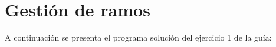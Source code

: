 \section{Gestión de ramos}

  A continuación se presenta el programa solución
  del ejercicio 1 de la guía:
  
  
    
  \pagebreak[4]